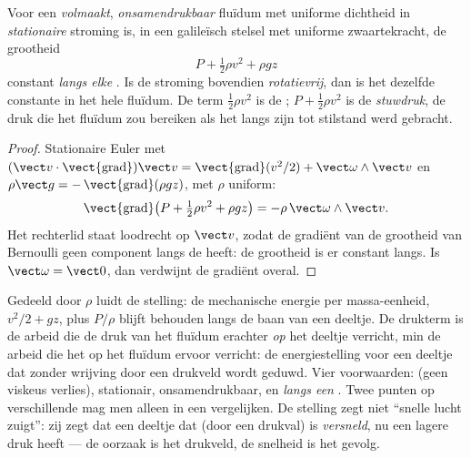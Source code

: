 \begin{theorem}[Bernoulli]\label{thm:b2:euler-bernoulli:bernoulli}
Voor een \emph{volmaakt}, \emph{onsamendrukbaar} fluïdum met uniforme
dichtheid in \emph{stationaire} stroming is, in een galileïsch stelsel met
uniforme zwaartekracht, de grootheid
\[
P + \tfrac12\rho v^2 + \rho gz
\]
constant \emph{langs elke }. Is de stroming bovendien
\emph{rotatievrij}, dan is het dezelfde constante in het hele fluïdum. De
term $\tfrac12\rho v^2$ is de \emph{}; $P + \tfrac12\rho v^2$
is de \emph{stuwdruk}, de druk die het fluïdum zou bereiken als het langs
zijn  tot stilstand werd gebracht.
\end{theorem}

\begin{proof}
Stationaire Euler met
$(\vect v\cdot\operatorname{\vect{grad}})\vect v =
\operatorname{\vect{grad}}(v^2/2) + \vect\omega\wedge\vect v$
en $\rho\vect g =
-\operatorname{\vect{grad}}(\rho gz)$, met $\rho$ uniform:
\[
\operatorname{\vect{grad}}\bigl(P + \tfrac12\rho v^2 + \rho gz\bigr) = -\rho\,
\vect\omega\wedge\vect v .
\]
Het rechterlid staat loodrecht op $\vect v$, zodat de gradiënt van de
grootheid van Bernoulli geen component langs de  heeft: de
grootheid is er constant langs. Is $\vect\omega = \vect 0$, dan verdwijnt de
gradiënt overal.
\end{proof}

\begin{remark}\label{rem:b2:euler-bernoulli:meaning}
Gedeeld door $\rho$ luidt de stelling: de mechanische energie per
massa-eenheid, $v^2/2 + gz$, plus $P/\rho$ blijft behouden langs de baan van
een deeltje. De drukterm is de arbeid die de druk van het fluïdum erachter
\emph{op} het deeltje verricht, min de arbeid die het op het fluïdum ervoor
verricht: de energiestelling voor een deeltje dat zonder wrijving door een
drukveld wordt geduwd. Vier voorwaarden:  (geen viskeus
verlies), stationair, onsamendrukbaar, en \emph{langs een }. Twee
punten op verschillende  mag men alleen in een  vergelijken. De stelling zegt niet ``snelle lucht zuigt'': zij zegt
dat een deeltje dat (door een drukval) is \emph{versneld}, nu een lagere
druk heeft --- de oorzaak is het drukveld, de snelheid is het gevolg.
\end{remark}

